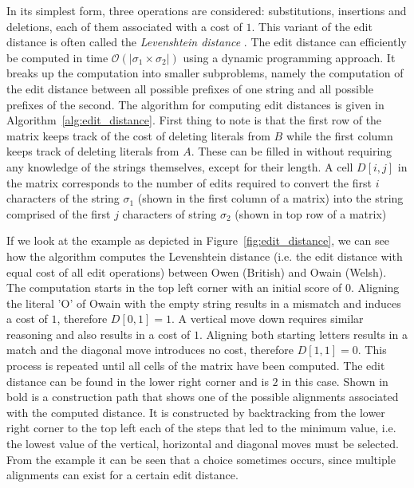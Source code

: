 \documentclass[paper=a4, fontsize=11pt]{scrartcl}
\begin{document}
In its simplest form, three operations are considered: substitutions, insertions and deletions, each of them associated with a cost of $1$.
This variant of the edit distance is often called the \emph{Levenshtein distance} .
The edit distance can efficiently be computed in time $\mathcal{O}(\vert \sigma_1 \times \sigma_2 \vert)$ using a dynamic programming approach.
It breaks up the computation into smaller subproblems, namely the computation of the edit distance between all possible prefixes of one string and all possible prefixes of the second.
The algorithm for computing edit distances is given in Algorithm~\ref{alg:edit_distance}.
First thing to note is that the first row of the matrix keeps track of the cost of deleting literals from $B$ while the first column keeps track of deleting literals from $A$.
These can be filled in without requiring any knowledge of the strings themselves, except for their length.
A cell $D[i,j]$ in the matrix corresponds to the number of edits required to convert the first $i$ characters of the string $\sigma_1$ (shown in the first column of a matrix) into the string comprised of the first $j$ characters of string $\sigma_2$ (shown in top row of a matrix) 

If we look at the example as depicted in Figure~\ref{fig:edit_distance}, we can see how the algorithm computes the Levenshtein distance (i.e. the edit distance with equal cost of all edit operations) between Owen (British) and Owain (Welsh).
The computation starts in the top left corner with an initial score of $0$.
Aligning the literal 'O' of Owain with the empty string results in a mismatch and induces a cost of $1$, therefore $D[0, 1]=1$.
A vertical move down requires similar reasoning and also results in a cost of $1$.
Aligning both starting letters results in a match and the diagonal move introduces no cost, therefore $D[1, 1]=0$.
This process is repeated until all cells of the matrix have been computed.
The edit distance can be found in the lower right corner and is $2$ in this case.
Shown in bold is a construction path that shows one of the possible alignments associated with the computed distance.
It is constructed by backtracking from the lower right corner to the top left each of the steps that led to the minimum value, i.e. the lowest value of the vertical, horizontal and diagonal moves must be selected.
From the example it can be seen that a choice sometimes occurs, since multiple alignments can exist for a certain edit distance.
\end{document}
